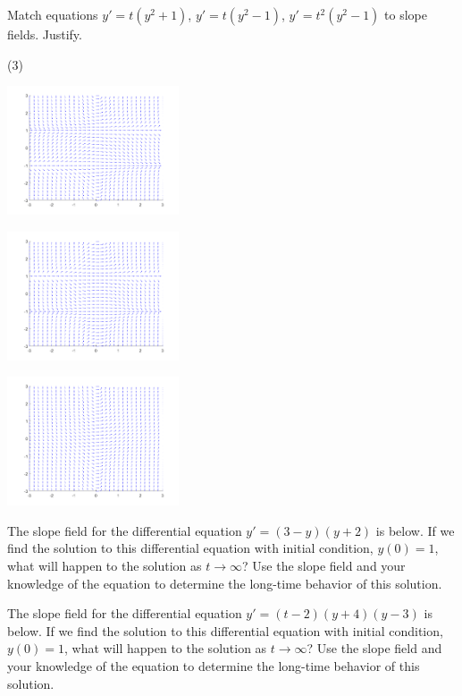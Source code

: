 \begin{exercise}
Match equations $y'=t(y^2 + 1)$, $y'=t(y^2 - 1)$, $y' = t^2(y^2 - 1)$ to slope fields.
Justify.
\begin{tasks}(3)
\task
\parbox[c]{1.75in}{\includegraphics[width=2in]{Images/yprimetysqm1slope}}
\task
\parbox[c]{1.75in}{\includegraphics[width=2in]{Images/yprimetsqysqm1slope}}
\task
\parbox[c]{1.75in}{\includegraphics[width=2in]{Images/yprimetysqp1slope}}
\end{tasks}
\end{exercise}

\begin{exercise}\label{ex:3myyp2}
The slope field for the differential equation $y' = (3-y)(y+2)$ is below. 
If we find the solution to this differential equation with initial condition, $y(0) = 1$, what will happen to the solution as $t \rightarrow \infty$? Use the slope field and your knowledge of the equation to determine the long-time behavior of this solution.
\end{exercise}

\begin{exercise}\label{ex:tm2yp4ym3}
The slope field for the differential equation $y' = (t-2)(y+4)(y-3)$ is below. 
If we find the solution to this differential equation with initial condition, $y(0) = 1$, what will happen to the solution as $t \rightarrow \infty$? Use the slope field and your knowledge of the equation to determine the long-time behavior of this solution.
\end{exercise}

